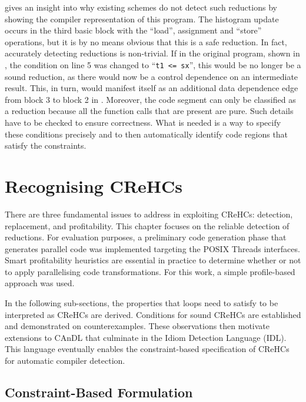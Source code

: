      gives an insight into why existing schemes do not
    detect such reductions by showing the compiler representation of this 
    program.
    The histogram update occurs in the third basic block with the ``load'',
    assignment and ``store'' operations, but it is by no means obvious that this
    is a safe reduction.
    In fact, accurately detecting reductions is non-trivial.
    If in the original program, shown in , the
    condition on line 5 was changed to ``{\tt t1 <= sx}'', this would be no
    longer be a sound reduction, as there would now be a control dependence on
    an intermediate result.
    This, in turn, would manifest itself as an additional data dependence edge
    from block 3 to block 2 in .
    Moreover, the code segment can only be classified as a reduction because
    all the function calls that are present are pure.
    Such details have to be checked to ensure correctness.
    What is needed is a way to specify these conditions precisely and to then
    automatically identify code regions that satisfy the constraints.

\section{Recognising CReHCs}

    There are three fundamental issues to address in exploiting CReHCs:
    detection, replacement, and profitability.
    This chapter focuses on the reliable detection of reductions.
    For evaluation purposes, a preliminary code generation phase that generates
    parallel code was implemented targeting the POSIX Threads interfaces.
    Smart profitability heuristics are essential in practice to determine
    whether or not to apply parallelising code transformations.
    For this work, a simple profile-based approach was used.

    In the following sub-sections, the properties that loops need to satisfy
    to be interpreted as CReHCs are derived.
    Conditions for sound CReHCs are established and demonstrated on
    counterexamples.
    These observations then motivate extensions to CAnDL that culminate in the
    Idiom Detection Language (IDL).
    This language eventually enables the constraint-based specification of
    CReHCs for automatic compiler detection.

\subsection{Constraint-Based Formulation}

